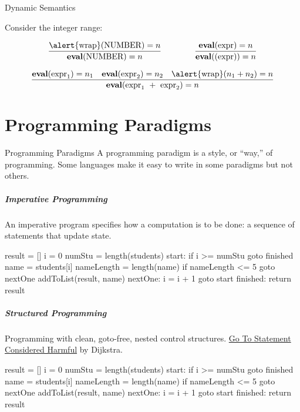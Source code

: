 \documentclass{plt}
\begin{document}
\begin{frame}{Dynamic Semantics}

Consider the integer range:

$$
\frac{\text{\alert{wrap}(NUMBER)} = n}{\textbf{eval}\text{(NUMBER)} = n} \qquad\qquad
\frac{\textbf{eval}\text{(expr)} = n}{\textbf{eval}\text{((expr))} = n}
$$

$$
\frac{\textbf{eval}(\text{expr}_1) = n_1 \quad \textbf{eval}(\text{expr}_2) = n_2
\quad \text{\alert{wrap}}(n_1 + n _2) = n}
{\textbf{eval}(\text{expr}_1\ +\ \text{expr}_2) = n}
$$

\end{frame}

\part{Programming Paradigms}

\begin{frame}{Programming Paradigms}
A programming paradigm is a \alert{style}, or ``way,'' of programming. 
Some languages make it easy to write in some paradigms but not others.
\end{frame}


\begin{frame}[fragile]
  \frametitle{Imperative Programming}
An imperative program specifies \alert{how} a computation is to be done: 
a sequence of statements that update state.


\begin{assembly}
    result = []
    i = 0
    numStu = length(students)
start:
    if i >= numStu goto finished
    name = students[i]
    nameLength = length(name)
    if nameLength <= 5 goto nextOne
    addToList(result, name)
nextOne:
    i = i + 1
    goto start
finished:
    return result
\end{assembly}
\end{frame}


\begin{frame}[fragile]
  \frametitle{Structured Programming}
Programming with clean, \alert{goto-free}, nested control structures.
\href{https://homepages.cwi.nl/~storm/teaching/reader/Dijkstra68.pdf}
{\alert{Go To Statement Considered Harmful}} by Dijkstra.


\begin{assembly}
    result = []
    i = 0
    numStu = length(students)
start:
    if i >= numStu goto finished
    name = students[i]
    nameLength = length(name)
    if nameLength <= 5 goto nextOne
    addToList(result, name)
nextOne:
    i = i + 1
    goto start
finished:
    return result
\end{assembly}
\end{frame}
\end{document}
